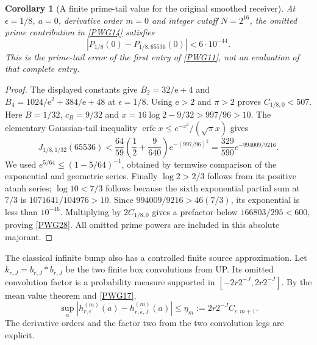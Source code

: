 \documentclass[11pt,a4paper]{article}
\newtheorem{corollary}[theorem]{Corollary}
\theoremstyle{definition}\newtheorem{definition}[theorem]{Definition}
\begin{document}
\begin{corollary}[A finite prime-tail value for the original smoothed receiver]
At $\epsilon=1/8$, $a=0$, derivative order $m=0$ and integer cutoff $N=2^{16}$, the omitted prime contribution in \eqref{PWG14} satisfies
\begin{equation}
 \boxed{|P_{1/8}(0)-P_{1/8,65536}(0)|<6\cdot10^{-44}.}
                                                               \tag{PWG28}\label{PWG28}
\end{equation}
This is the prime-tail error of the first entry of \eqref{PWG11}, not an evaluation of that complete entry.
\end{corollary}
\begin{proof}
The displayed constants give
$B_2=32/\mathrm e+4$ and
$B_4=1024/\mathrm e^2+384/\mathrm e+48$ at $\epsilon=1/8$.
Using $\mathrm e>2$ and $\pi>2$ proves $C_{1/8,0}<507$.
Here $B=1/32$, $c_B=9/32$ and
$x=16\log2-9/32>997/96>10$.
The elementary Gaussian-tail inequality
$\operatorname{erfc}x\le e^{-x^2}/(\sqrt\pi x)$ gives
\[
 J_{1/8,1/32}(65536)
 <\frac{64}{59}\left(\frac12+\frac9{640}\right)
       e^{-(997/96)^2}=\frac{329}{590}e^{-994009/9216}.
\]
We used $e^{5/64}\le(1-5/64)^{-1}$, obtained by termwise comparison of the exponential and geometric series. Finally $\log2>2/3$ follows from its positive atanh series; $\log10<7/3$ follows because the sixth exponential partial sum at $7/3$ is $1071641/104976>10$.
Since $994009/9216>46(7/3)$, its exponential is less than $10^{-46}$.
Multiplying by $2C_{1/8,0}$ gives a prefactor below $166803/295<600$, proving \eqref{PWG28}. All omitted prime powers are included in this absolute majorant.
\end{proof}

The classical infinite bump also has a controlled finite source approximation. Let $k_{r,J}=b_{r,J}*b_{r,J}$ be the two finite box convolutions from UP. Its omitted convolution factor is a probability measure supported in
$[-2r2^{-J},2r2^{-J}]$. By the mean value theorem and \eqref{PWG17},
\begin{equation}
 \sup_a|h_{r,\epsilon}^{(m)}(a)-h_{r,\epsilon,J}^{(m)}(a)|
 \le\eta_m:=2r2^{-J}C_{\epsilon,m+1}.                        \tag{PWG20}\label{PWG20}
\end{equation}
The derivative orders and the factor two from the two convolution legs are explicit.
\end{document}
